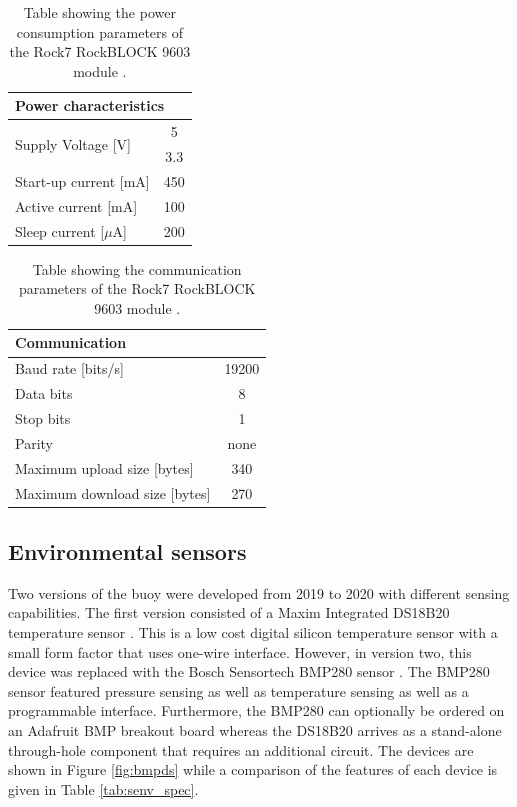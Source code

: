 \begin{table}[H]
	\centering
	\caption{Table showing the power consumption parameters of the Rock7 RockBLOCK 9603 module \cite{9603}.}
	\setlength{\extrarowheight}{5pt}
	\begin{tabular}{lc}
		\hline
		\multicolumn{2}{l}{\textbf{Power characteristics}}\\
		\hline
		\hline
		\multirow{2}{*}{Supply Voltage [V]} & 5 \\ & 3.3\\ 
		\hline
		Start-up current [mA] & 450 \\
		\hline
		Active current [mA] & 100 \\
		\hline
		Sleep current [$\mu$A] & 200\\
		\hline
		\hline
	\end{tabular}	
	\label{tab:ir_specspower}
\end{table}

\begin{table}[H]
	\centering
	\caption{Table showing the communication parameters of the Rock7 RockBLOCK 9603 module \cite{9603}.}
	\setlength{\extrarowheight}{5pt}
	\begin{tabular}{lc}
		\hline
		\multicolumn{2}{l}{\textbf{Communication}}\\
		\hline
		\hline
		Baud rate [bits/s] & 19200\\
		\hline
		Data bits &  8\\
		\hline
		Stop bits & 1 \\
		\hline
		Parity & none \\
		\hline
		Maximum upload size [bytes] & 340\\
		\hline
		Maximum download size [bytes]	 & 270\\
		\hline
		\hline
	\end{tabular}
	
	\label{tab:ir_specscomm}
\end{table}
\subsection{Environmental sensors}

Two versions of the buoy were developed from 2019 to 2020 with different sensing capabilities. The first version consisted of a Maxim Integrated DS18B20 temperature sensor \cite{DS18B20manual}. This is a low cost digital silicon temperature sensor with a small form factor that uses one-wire interface. However, in version two, this device was replaced with the Bosch Sensortech BMP280 sensor \cite{BMP280_Datasheet}. The BMP280 sensor featured pressure sensing as well as temperature sensing as well as a programmable interface. Furthermore, the BMP280 can optionally be ordered on an Adafruit BMP breakout board \cite{BMP280breakout} whereas the DS18B20 arrives as a stand-alone through-hole component that requires an additional circuit. The devices are shown in Figure \ref{fig:bmpds} while a comparison of the features of each device is given in Table \ref{tab:senv_spec}.

